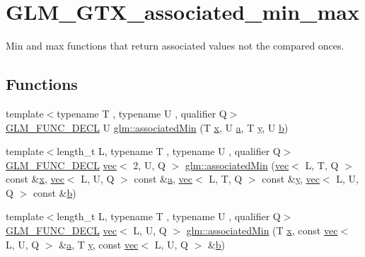 \hypertarget{group__gtx__associated__min__max}{}\section{G\+L\+M\+\_\+\+G\+T\+X\+\_\+associated\+\_\+min\+\_\+max}
\label{group__gtx__associated__min__max}


Min and max functions that return associated values not the compared onces.  


\subsection*{Functions}
\begin{DoxyCompactItemize}
\item 
{\footnotesize template$<$typename T , typename U , qualifier Q$>$ }\\\hyperlink{setup_8hpp_ab2d052de21a70539923e9bcbf6e83a51}{G\+L\+M\+\_\+\+F\+U\+N\+C\+\_\+\+D\+E\+CL} U \hyperlink{group__gtx__associated__min__max_gacc01bd272359572fc28437ae214a02df}{glm\+::associated\+Min} (T \hyperlink{_s_d_l__opengl_8h_ad0e63d0edcdbd3d79554076bf309fd47}{x}, U \hyperlink{_s_d_l__opengl__glext_8h_a3309789fc188587d666cda5ece79cf82}{a}, T \hyperlink{_s_d_l__opengl_8h_a1675d9d7bb68e1657ff028643b4037e3}{y}, U \hyperlink{_s_d_l__opengl__glext_8h_a0f71581a41fd2264c8944126dabbd010}{b})
\item 
{\footnotesize template$<$length\+\_\+t L, typename T , typename U , qualifier Q$>$ }\\\hyperlink{setup_8hpp_ab2d052de21a70539923e9bcbf6e83a51}{G\+L\+M\+\_\+\+F\+U\+N\+C\+\_\+\+D\+E\+CL} \hyperlink{structglm_1_1vec}{vec}$<$ 2, U, Q $>$ \hyperlink{group__gtx__associated__min__max_gac2f0dff90948f2e44386a5eafd941d1c}{glm\+::associated\+Min} (\hyperlink{structglm_1_1vec}{vec}$<$ L, T, Q $>$ const \&\hyperlink{_s_d_l__opengl_8h_ad0e63d0edcdbd3d79554076bf309fd47}{x}, \hyperlink{structglm_1_1vec}{vec}$<$ L, U, Q $>$ const \&\hyperlink{_s_d_l__opengl__glext_8h_a3309789fc188587d666cda5ece79cf82}{a}, \hyperlink{structglm_1_1vec}{vec}$<$ L, T, Q $>$ const \&\hyperlink{_s_d_l__opengl_8h_a1675d9d7bb68e1657ff028643b4037e3}{y}, \hyperlink{structglm_1_1vec}{vec}$<$ L, U, Q $>$ const \&\hyperlink{_s_d_l__opengl__glext_8h_a0f71581a41fd2264c8944126dabbd010}{b})
\item 
{\footnotesize template$<$length\+\_\+t L, typename T , typename U , qualifier Q$>$ }\\\hyperlink{setup_8hpp_ab2d052de21a70539923e9bcbf6e83a51}{G\+L\+M\+\_\+\+F\+U\+N\+C\+\_\+\+D\+E\+CL} \hyperlink{structglm_1_1vec}{vec}$<$ L, U, Q $>$ \hyperlink{group__gtx__associated__min__max_gacfec519c820331d023ef53a511749319}{glm\+::associated\+Min} (T \hyperlink{_s_d_l__opengl_8h_ad0e63d0edcdbd3d79554076bf309fd47}{x}, const \hyperlink{structglm_1_1vec}{vec}$<$ L, U, Q $>$ \&\hyperlink{_s_d_l__opengl__glext_8h_a3309789fc188587d666cda5ece79cf82}{a}, T \hyperlink{_s_d_l__opengl_8h_a1675d9d7bb68e1657ff028643b4037e3}{y}, const \hyperlink{structglm_1_1vec}{vec}$<$ L, U, Q $>$ \&\hyperlink{_s_d_l__opengl__glext_8h_a0f71581a41fd2264c8944126dabbd010}{b})

\end{DoxyCompactItemize}

